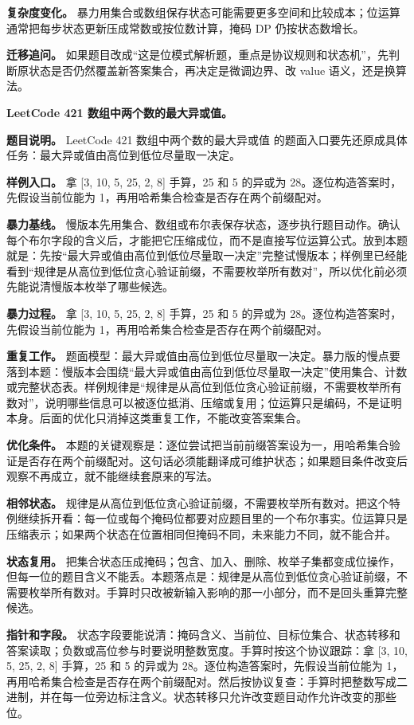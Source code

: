 \textbf{复杂度变化。} 暴力用集合或数组保存状态可能需要更多空间和比较成本；位运算通常把每步状态更新压成常数或按位数计算，掩码 DP 仍按状态数增长。

\textbf{迁移追问。} 如果题目改成“这是位模式解析题，重点是协议规则和状态机”，先判断原状态是否仍然覆盖新答案集合，再决定是微调边界、改 value 语义，还是换算法。

\noindent\textbf{LeetCode 421 数组中两个数的最大异或值。}

\textbf{题目说明。} LeetCode 421 数组中两个数的最大异或值 的题面入口要先还原成具体任务：最大异或值由高位到低位尽量取一决定。

\textbf{样例入口。} 拿 [3, 10, 5, 25, 2, 8] 手算，25 和 5 的异或为 28。逐位构造答案时，先假设当前位能为 1，再用哈希集合检查是否存在两个前缀配对。

\textbf{暴力基线。} 慢版本先用集合、数组或布尔表保存状态，逐步执行题目动作。确认每个布尔字段的含义后，才能把它压缩成位，而不是直接写位运算公式。放到本题就是：先按“最大异或值由高位到低位尽量取一决定”完整试慢版本；样例里已经能看到“规律是从高位到低位贪心验证前缀，不需要枚举所有数对”，所以优化前必须先能说清慢版本枚举了哪些候选。

\textbf{暴力过程。} 拿 [3, 10, 5, 25, 2, 8] 手算，25 和 5 的异或为 28。逐位构造答案时，先假设当前位能为 1，再用哈希集合检查是否存在两个前缀配对。

\textbf{重复工作。} 题面模型：最大异或值由高位到低位尽量取一决定。暴力版的慢点要落到本题：慢版本会围绕“最大异或值由高位到低位尽量取一决定”使用集合、计数或完整状态表。样例规律是“规律是从高位到低位贪心验证前缀，不需要枚举所有数对”，说明哪些信息可以被逐位抵消、压缩或复用；位运算只是编码，不是证明本身。后面的优化只消掉这类重复工作，不能改变答案集合。

\textbf{优化条件。} 本题的关键观察是：逐位尝试把当前前缀答案设为一，用哈希集合验证是否存在两个前缀配对。这句话必须能翻译成可维护状态；如果题目条件改变后观察不再成立，就不能继续套原来的写法。

\textbf{相邻状态。} 规律是从高位到低位贪心验证前缀，不需要枚举所有数对。把这个特例继续拆开看：每一位或每个掩码位都要对应题目里的一个布尔事实。位运算只是压缩表示；如果两个状态在位置相同但掩码不同，未来能力不同，就不能合并。

\textbf{状态复用。} 把集合状态压成掩码；包含、加入、删除、枚举子集都变成位操作，但每一位的题目含义不能丢。本题落点是：规律是从高位到低位贪心验证前缀，不需要枚举所有数对。手算时只改被新输入影响的那一小部分，而不是回头重算完整候选。

\textbf{指针和字段。} 状态字段要能说清：掩码含义、当前位、目标位集合、状态转移和答案读取；负数或高位参与时要说明整数宽度。手算时按这个协议跟踪：拿 [3, 10, 5, 25, 2, 8] 手算，25 和 5 的异或为 28。逐位构造答案时，先假设当前位能为 1，再用哈希集合检查是否存在两个前缀配对。然后按协议复查：手算时把整数写成二进制，并在每一位旁边标注含义。状态转移只允许改变题目动作允许改变的那些位。

